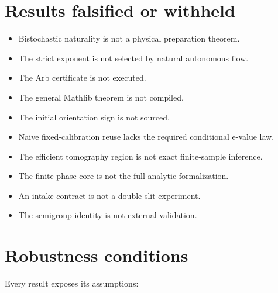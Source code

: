 \documentclass[11pt,a4paper,openany]{report}
\begin{document}
\section{Results falsified or withheld}

\begin{itemize}
\item 
Bistochastic naturality is not a physical preparation theorem.

\item 
The strict exponent is not selected by natural autonomous flow.

\item 
The Arb certificate is not executed.

\item 
The general Mathlib theorem is not compiled.

\item 
The initial orientation sign is not sourced.

\item 
Naive fixed-calibration reuse lacks the required conditional e-value law.

\item 
The efficient tomography region is not exact finite-sample inference.

\item 
The finite phase core is not the full analytic formalization.

\item 
An intake contract is not a double-slit experiment.

\item 
The semigroup identity is not external validation.

\end{itemize}

\section{Robustness conditions}

Every result exposes its assumptions:
\end{document}
